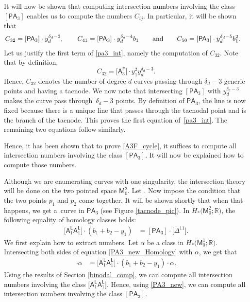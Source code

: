 \documentclass[pdftex]{sigma}
\numberwithin{equation}{section}
\begin{document}
It will now be shown that computing intersection numbers involving the class
$[\mathsf{P}\mathsf{A}_3]$ enables us to compute the numbers $C_{ij}$.
In particular, it will be shown that
\begin{align}
C_{32}& =[\mathsf{P}\mathsf{A}_3]\cdot y_d^{\delta_d-3}, \qquad
C_{41} = [\mathsf{P}\mathsf{A}_3]\cdot y_d^{\delta_d-4} b_1 \qquad \textnormal{and} \qquad
C_{50} = [\mathsf{P}\mathsf{A}_3]\cdot y_d^{\delta_d-5} b_1^2. \label{pa3_int}
\end{align}
Let us justify the first term of \eqref{pa3_int}, namely the computation of $C_{32}$.
Note that by definition,
\[
C_{32} = \bigl[\mathsf{A}_3^{\mathsf{F}}\bigr]\cdot y_1^2 y_d^{\delta_d-3}.
\]
Hence, $C_{32}$ denotes the number of degree $d$ curves passing through $\delta_d-3$ generic points
and having a tacnode. We now note that intersecting $[\mathsf{P}\mathsf{A}_3]$
with $y_d^{\delta_d-3}$ makes the curve pass through~${\delta_d-3}$ points.
By definition of $\mathsf{P}\mathsf{A}_3$, the line is now fixed because there is a unique
line that passes through the tacnodal point and is the branch of the tacnode. This proves the first equation of~\eqref{pa3_int}.
The remaining two equations follow similarly.

Hence, it has been shown that to prove \eqref{A3F_cycle}, it suffices to compute all intersection numbers
involving the class $[\mathsf{P}\mathsf{A}_3]$. It will now be explained how to compute those
numbers.

Although we are enumerating curves with one singularity, the intersection theory will be done on the
two pointed space $\mathsf{M}^2_0$.
Let .
Now impose the condition that the two points $p_1$ and $p_2$ come together.
It will be shown shortly that when that happens, we get a~curve in $\mathsf{PA}_3$ (see Figure \ref{tacnode_pic}).
In $H_*\bigl(\mathsf{M}^2_0; \mathbb{R}\bigr)$,
the following equality of homology classes holds:
\begin{align}
\bigl[\mathsf{A}_1^{\mathsf{L}} \mathsf{A}_1^{\mathsf{L}}\bigr] \cdot (b_1+b_2-y_1)
& =  [\mathsf{PA}_3]\cdot \bigl[\Delta^{11}\bigr].
\label{PA3_new_Homology}
\end{align}
We first explain how to extract numbers.
Let $\alpha$ be a class in $H_*\bigl(\mathsf{M}^1_0; \mathbb{R}\bigr)$.
Intersecting both sides of equation \eqref{PA3_new_Homology} with $\alpha$, we get that
\begin{align}
[\mathsf{PA}_3]\cdot \alpha & =
\bigl[\mathsf{A}_1^{\mathsf{L}} \mathsf{A}_1^{\mathsf{L}}\bigr] \cdot (b_1+b_2-y_1) \cdot \alpha .
\label{PA3_new}
\end{align}
Using the results of Section \ref{binodal_comp}, we can compute all intersection numbers involving the class
$\bigl[\mathsf{A}_1^{\mathsf{L}} \mathsf{A}_1^{\mathsf{L}}\bigr]$. Hence, using \eqref{PA3_new},
we can compute all intersection numbers involving the class $[\mathsf{PA}_3]$.
\end{document}

